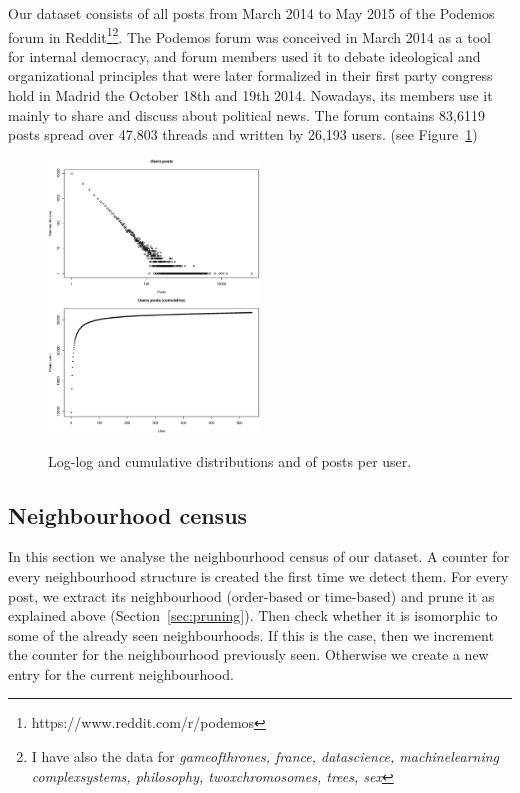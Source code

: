 \documentclass[conference]{IEEEtran}
\begin{document}
Our dataset consists of all posts from March 2014 to May 2015 of the Podemos forum in Reddit\footnote{https://www.reddit.com/r/podemos}\footnote{I have also the data for \textit{gameofthrones, france, datascience, machinelearning complexsystems, philosophy, twoxchromosomes, trees, sex}}. The Podemos forum was conceived in March 2014 as a tool for internal democracy, and forum members used it to debate ideological and organizational principles that were later formalized in their first party congress hold in Madrid the October 18th and 19th 2014. Nowadays, its members use it mainly to share and discuss about political news.
The forum contains 83,6119 posts spread over 47,803 threads and written by 26,193 users. (see Figure~\ref{fig:podemos_distributions})

\begin{figure}
\centering
\includegraphics[width=0.5\textwidth]{users_posts}%
\includegraphics[width=0.5\textwidth]{users_posts_cum}
\caption{Log-log and cumulative distributions and of posts per user.}
\label{fig:podemos_distributions}
\end{figure}

\subsection{Neighbourhood census}
In this section we analyse the neighbourhood census of our dataset. A counter for every neighbourhood structure is created the first time we detect them. For every post, we extract its neighbourhood (order-based or time-based) and prune it as explained above (Section~\ref{sec:pruning}). Then check whether it is isomorphic to some of the already seen neighbourhoods. If this is the case, then we increment the counter for the neighbourhood previously seen. Otherwise we create a new entry for the current neighbourhood.
\end{document}
